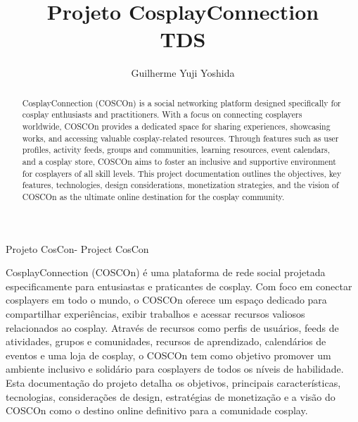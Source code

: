 \documentclass[12pt,a4paper,chapter=TITLE,section=TITLE,subsection=TITLE,subsubsection=TITLE]{article}
\title{Projeto CosplayConnection\\ TDS }
\author{Guilherme Yuji Yoshida\inst{1} }
\begin{document}
  


\frenchspacing 


%
%

\maketitle
Projeto CosCon-
Project CosCon

\begin{abstract}
  CosplayConnection (COSCOn) is a social networking platform designed specifically for cosplay enthusiasts and practitioners. With a focus on connecting cosplayers worldwide, COSCOn provides a dedicated space for sharing experiences, showcasing works, and accessing valuable cosplay-related resources. Through features such as user profiles, activity feeds, groups and communities, learning resources, event calendars, and a cosplay store, COSCOn aims to foster an inclusive and supportive environment for cosplayers of all skill levels. This project documentation outlines the objectives, key features, technologies, design considerations, monetization strategies, and the vision of COSCOn as the ultimate online destination for the cosplay community.
\end{abstract}
     
\begin{resumo1} 
  CosplayConnection (COSCOn) é uma plataforma de rede social projetada especificamente para entusiastas e praticantes de cosplay. Com foco em conectar cosplayers em todo o mundo, o COSCOn oferece um espaço dedicado para compartilhar experiências, exibir trabalhos e acessar recursos valiosos relacionados ao cosplay. Através de recursos como perfis de usuários, feeds de atividades, grupos e comunidades, recursos de aprendizado, calendários de eventos e uma loja de cosplay, o COSCOn tem como objetivo promover um ambiente inclusivo e solidário para cosplayers de todos os níveis de habilidade. Esta documentação do projeto detalha os objetivos, principais características, tecnologias, considerações de design, estratégias de monetização e a visão do COSCOn como o destino online definitivo para a comunidade cosplay.
\end{resumo1}
\end{document}
